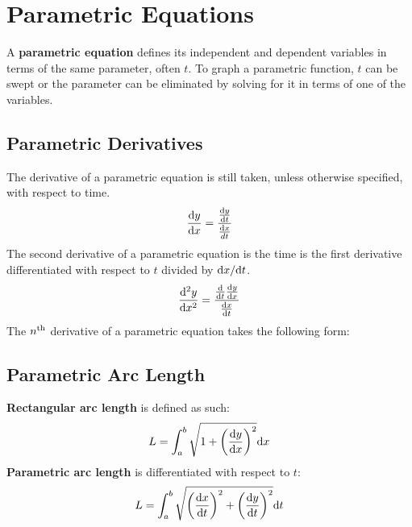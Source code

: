 \documentclass[../AP_Calculus]{subfiles}
\begin{document}
	\section{Parametric Equations}
		A \textbf{parametric equation} defines its independent and dependent variables in terms of the same parameter, often $t$.
		To graph a parametric function, $t$ can be swept or the parameter can be eliminated by solving for it in terms of one of the variables.
		\subsection{Parametric Derivatives}
		The derivative of a parametric equation is still taken, unless otherwise specified, with respect to time.
		\[\frac{\mathrm{d} y}{\mathrm{d} x} = \frac{\frac{\mathrm{d} y}{\mathrm{d} t}}{\frac{\mathrm{d} x}{d t}}\]
		The second derivative of a parametric equation is the time is the first derivative differentiated with respect to $t$ divided by $\mathrm{d} x/\mathrm{d} t$.
		\[\frac{\mathrm{d}^2y}{\mathrm{d} x^2} = \frac{\frac{\mathrm{d}}{\mathrm{d} t}\frac{\mathrm{d} y}{\mathrm{d} x}}{\frac{\mathrm{d} x}{\mathrm{d} t}}\]
		The $n^{\mathrm{th}}$ derivative of a parametric equation takes the following form: \\
		\subsection{Parametric Arc Length}
			\textbf{Rectangular arc length} is defined as such:
			\[L = \int_a^b\sqrt{1 + \left(\frac{\mathrm{d} y}{\mathrm{d} x}\right)^2}\mathrm{d} x\]
		\textbf{Parametric arc length} is differentiated with respect to $t$:
		\[L = \int_a^b\sqrt{\left(\frac{\mathrm{d} x}{\mathrm{d} t}\right)^2 + \left(\frac{\mathrm{d} y}{\mathrm{d} t}\right)^2}\mathrm{d} t\]
\end{document}
